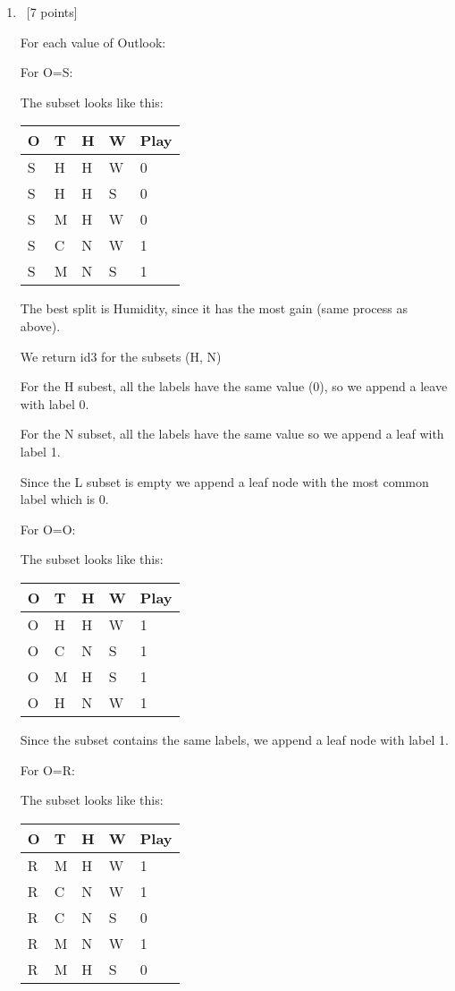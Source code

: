 \documentclass[12pt, fullpage,letterpaper]{article}
\begin{document}
\begin{enumerate}
\begin{enumerate}
\item~[7 points] 

For each value of Outlook:

For O=S:

The subset looks like this:

\begin{tabular}{|l|l|l|l|l|}
	\hline
	O & T & H & W & Play \\ \hline
	S & H & H & W & 0    \\ \hline
	S & H & H & S & 0    \\ \hline
	S & M & H & W & 0    \\ \hline
	S & C & N & W & 1    \\ \hline
	S & M & N & S & 1    \\ \hline
	\end{tabular}

The best split is Humidity, since it has the most gain (same process as above).

We return id3 for the subsets (H, N)

For the H subest, all the labels have the same value (0), so we append a leave with label 0.

For the N subset, all the labels have the same value so we append a leaf with label 1.

Since the L subset is empty  we append a leaf node with the most common label which is 0. 

For O=O:

The subset looks like this:

\begin{tabular}{|l|l|l|l|l|}
	\hline
	O & T & H & W & Play \\ \hline
	O & H & H & W & 1    \\ \hline
	O & C & N & S & 1    \\ \hline
	O & M & H & S & 1    \\ \hline
	O & H & N & W & 1    \\ \hline
	\end{tabular}


Since the subset contains the same labels, we append a leaf node with label 1.

For O=R:

The subset looks like this:

\begin{tabular}{|l|l|l|l|l|}
	\hline
	O & T & H & W & Play \\ \hline
	R & M & H & W & 1    \\ \hline
	R & C & N & W & 1    \\ \hline
	R & C & N & S & 0    \\ \hline
	R & M & N & W & 1    \\ \hline
	R & M & H & S & 0    \\ \hline
	\end{tabular}



\end{enumerate}
\end{enumerate}
\end{document}
